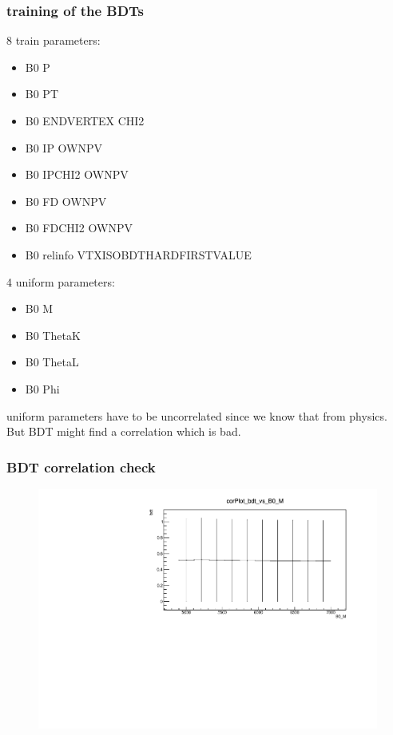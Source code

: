 \documentclass{beamer}
\begin{document}
\begin{frame}
  \frametitle{training of the BDTs}
  8 train parameters:
  \begin{itemize}
    \item B0 P
    \item B0 PT
    \item B0 ENDVERTEX CHI2
    \item B0 IP OWNPV
    \item B0 IPCHI2 OWNPV
    \item B0 FD OWNPV
    \item B0 FDCHI2 OWNPV
    \item B0 relinfo VTXISOBDTHARDFIRSTVALUE
  \end{itemize}
  4 uniform parameters:
  \begin{itemize}
    \item B0 M
    \item B0 ThetaK
    \item B0 ThetaL
    \item B0 Phi
  \end{itemize}
  uniform parameters have to be uncorrelated since we know that from physics.
  But BDT might find a correlation which is bad.
\end{frame}

\begin{frame}
  \frametitle{BDT correlation check}

  \begin{figure}
  \includegraphics[width=1.0\linewidth]{plots/corPlot_bdt_vs_B0_M.pdf}
  \end{figure}

\end{frame}
\end{document}
